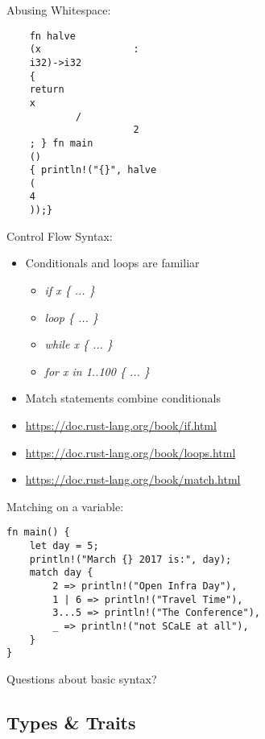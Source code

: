 \documentclass[aspectratio=169]{beamer}
\begin{document}
\begin{frame}[fragile]
    Abusing Whitespace:

\begin{verbatim}
    fn halve
    (x                :
    i32)->i32
    {
    return
    x
            /
                      2
    ; } fn main
    ()
    { println!("{}", halve
    (
    4
    ));}
\end{verbatim}

\end{frame}

\begin{frame}
    Control Flow Syntax:
    \begin{itemize}
        \item Conditionals and loops are familiar
        \begin{itemize}
            \item \textit{if x \{ ... \}}
            \item \textit{loop \{ ... \}}
            \item \textit{while x \{ ... \}}
            \item \textit{for x in 1..100 \{ ... \}}
        \end{itemize}
        \item Match statements combine conditionals
        \item \url{https://doc.rust-lang.org/book/if.html}
        \item \url{https://doc.rust-lang.org/book/loops.html}
        \item \url{https://doc.rust-lang.org/book/match.html}
    \end{itemize}
\end{frame}

\begin{frame}[fragile]
Matching on a variable:
\begin{verbatim}
fn main() {
    let day = 5;
    println!("March {} 2017 is:", day);
    match day {
        2 => println!("Open Infra Day"),
        1 | 6 => println!("Travel Time"),
        3...5 => println!("The Conference"),
        _ => println!("not SCaLE at all"),
    }
}
\end{verbatim}
\end{frame}
\begin{frame}
    \hfill Questions about basic syntax?
\end{frame}


\subsection{Types \& Traits}
\end{document}
